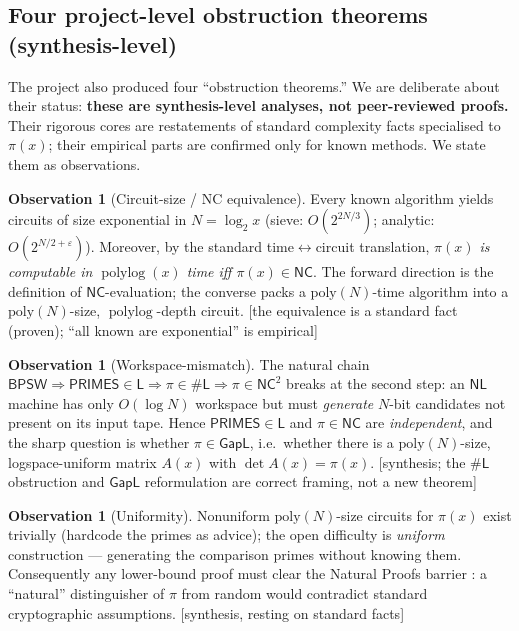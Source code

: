 \documentclass[11pt]{article}
\theoremstyle{plain}
\theoremstyle{definition}
\newtheorem{observation}[theorem]{Observation}
\theoremstyle{remark}
\newcommand{\stat}[1]{\quad\textnormal{\footnotesize\textsf{[\textcolor{accent}{#1}]}}}
\DeclareMathOperator{\polylog}{polylog}
\newcommand{\eps}{\varepsilon}
\newcommand{\NC}{\mathsf{NC}}
\newcommand{\Lclass}{\mathsf{L}}
\newcommand{\GapL}{\mathsf{GapL}}
\begin{document}
\subsection{Four project-level obstruction theorems (synthesis-level)}

The project also produced four ``obstruction theorems.'' We are deliberate about
their status: \textbf{these are synthesis-level analyses, not peer-reviewed
proofs.} Their rigorous cores are restatements of standard complexity facts
specialised to $\pi(x)$; their empirical parts are confirmed only for known
methods. We state them as observations.

\begin{observation}[Circuit-size / NC equivalence]
\label{obs:circuit}
Every known algorithm yields circuits of size exponential in $N=\log_2 x$
(sieve: $O(2^{2N/3})$; analytic: $O(2^{N/2+\eps})$). Moreover, by the standard
time$\leftrightarrow$circuit translation, \emph{$\pi(x)$ is computable in
$\polylog(x)$ time iff $\pi(x)\in\NC$}. The forward direction is the definition
of $\NC$-evaluation; the converse packs a $\mathrm{poly}(N)$-time algorithm into
a $\mathrm{poly}(N)$-size, $\polylog$-depth circuit.
\stat{the equivalence is a standard fact (proven); ``all known are exponential'' is empirical}
\end{observation}

\begin{observation}[Workspace-mismatch]
\label{obs:workspace}
The natural chain
$\textsf{BPSW}\Rightarrow\textsf{PRIMES}\in\Lclass\Rightarrow\pi\in\#\Lclass
\Rightarrow\pi\in\NC^2$ breaks at the second step: an $\mathsf{NL}$ machine has
only $O(\log N)$ workspace but must \emph{generate} $N$-bit candidates not present
on its input tape. Hence $\textsf{PRIMES}\in\Lclass$ and $\pi\in\NC$ are
\emph{independent}, and the sharp question is whether $\pi\in\GapL$, i.e.\ whether
there is a $\mathrm{poly}(N)$-size, logspace-uniform matrix $A(x)$ with
$\det A(x)=\pi(x)$.
\stat{synthesis; the $\#\Lclass$ obstruction and $\GapL$ reformulation are correct framing, not a new theorem}
\end{observation}

\begin{observation}[Uniformity]
\label{obs:uniformity}
Nonuniform $\mathrm{poly}(N)$-size circuits for $\pi(x)$ exist trivially (hardcode
the primes as advice); the open difficulty is \emph{uniform} construction ---
generating the comparison primes without knowing them. Consequently any
lower-bound proof must clear the Natural Proofs barrier
\cite{razborovrudich1997}: a ``natural'' distinguisher of $\pi$ from random would
contradict standard cryptographic assumptions.
\stat{synthesis, resting on standard facts}
\end{observation}
\end{document}
